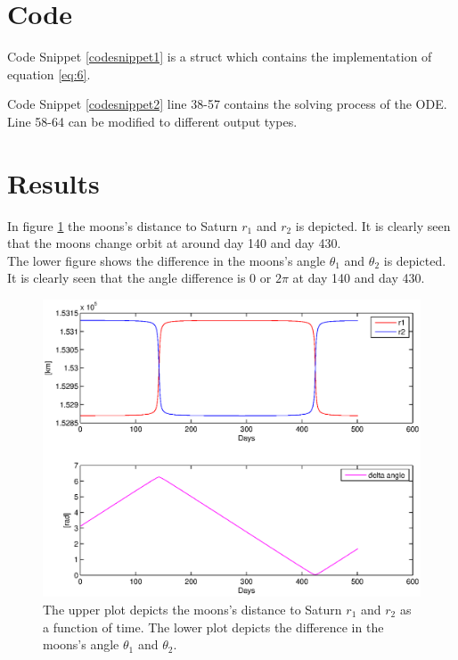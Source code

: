 \section{Code}
Code Snippet \ref{codesnippet1} is a struct which contains the implementation of equation \ref{eq:6}.
\quad

Code Snippet \ref{codesnippet2} line 38-57 contains the solving process of the ODE. Line 58-64 can be modified to different output types.
\quad


\section{Results}
In figure \ref{fig:} the moons's distance to Saturn $r_1$ and $r_2$ is depicted. It is clearly seen that the moons change orbit at around day 140 and day 430. \\
The lower figure shows the difference in the moons's angle $\theta_1$ and $\theta_2$ is depicted. It is clearly seen that the angle difference is $0$ or $2\pi$ at day 140 and day 430. 

\begin{figure}[h!]
\centering
\includegraphics[width=1\textwidth]{./graphics/subplot.eps}
\caption[tekst i indholdsfortegnelsen]{The upper plot depicts the moons's distance to Saturn $r_1$ and $r_2$ as a function of time. The lower plot depicts the difference in the moons's angle $\theta_1$ and $\theta_2$.}
\label{fig:}
\end{figure}

